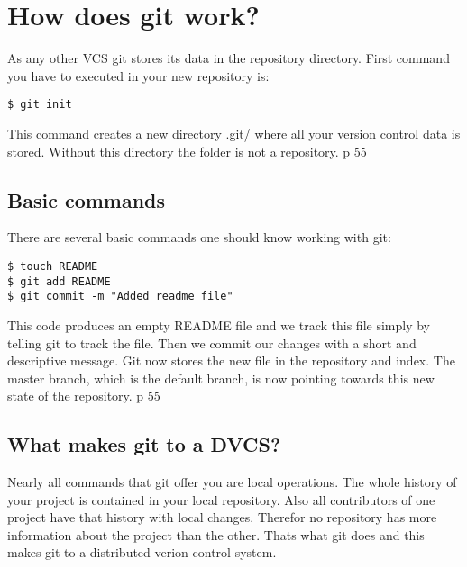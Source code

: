 \section{How does git work?}

As any other VCS git stores its data in the repository directory. First command you have to executed in your new repository is:
\begin{lstlisting}
$ git init
\end{lstlisting}
This command creates a new directory .git/ where all your version control data is stored. Without this directory the folder is not a repository. \cite{gitinternals2008} p 55 \\

\subsection {Basic commands}

There are several basic commands one should know working with git:
\begin{lstlisting}
$ touch README
$ git add README
$ git commit -m "Added readme file"
\end{lstlisting}

This code produces an empty README file and we track this file simply by telling git to track the file. Then we commit our changes with a short and descriptive message. Git now stores the new file in the repository and index. The master branch, which is the default branch, is now pointing towards this new state of the repository. \cite{gitinternals2008} p 55 \\



\subsection {What makes git to a DVCS?}

Nearly all commands that git offer you are local operations. The whole history of your project is contained in your local repository. Also all contributors of one project have that history with local changes. Therefor no repository has more information about the project than the other. Thats what git does and this makes git to a distributed verion control system.